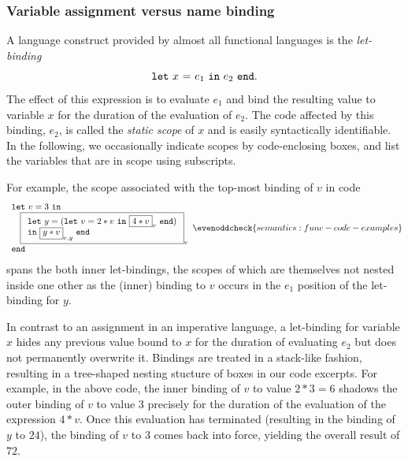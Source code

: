 \subsubsection{Variable assignment versus name binding}
A language construct provided by almost all functional languages is
the \emph{let-binding} $$\mathtt{let}\ {x}\ \mathtt{=}\ {e_1}\ \mathtt{in}\ {e_2}\ \mathtt{end}.$$ The effect of this
expression is to evaluate $e_1$ and bind the resulting value to
variable $x$ for the duration of the evaluation of $e_2$.  The code
affected by this binding, $e_2$, is called the \emph{static scope} of
$x$ and is easily syntactically identifiable.  In the following, we
occasionally indicate scopes by code-enclosing boxes, and list the
variables that are in scope using subscripts.

For example, the scope associated with the top-most binding of $v$ in
code
\begin{equation}
\label{FunctionalCodeExample1}
\begin{array}{l}
\mathtt{let}\ v = 3\ \mathtt{in}\\
\quad 
  \fbox{$
   \begin{array}[t]{l} 
    \mathtt{let}\ y = (\mathtt{let}\ v=2*v \ \mathtt{in}\ \fbox{$4*v$}_v\ \mathtt{end})\\
    \mathtt{in}\ \fbox{$y*v$}_{v,y}\ \mathtt{end}\\
\end{array}$}_v\\
\mathtt{end}
\end{array}
  \evenoddcheck{semantics:func-code-examples}
\end{equation}
spans the both inner let-bindings, the scopes of which are themselves
not nested inside one other as the (inner) binding to $v$ occurs in
the $e_1$ position of the let-binding for $y$.

In contrast to an assignment in an imperative language, a let-binding
for variable $x$ hides any previous value bound to $x$ for the
duration of evaluating $e_2$ but does not permanently overwrite
it. Bindings are treated in a stack-like fashion, resulting in a
tree-shaped nesting stucture of boxes in our code excerpts.
For example, in the above code, the inner binding of $v$ to value
$2*3=6$ shadows the outer binding of $v$ to value $3$ precisely for
the duration of the evaluation of the expression $4*v$. Once this
evaluation has terminated (resulting in the binding of $y$ to $24$),
the binding of $v$ to $3$ comes back into force, yielding the overall
result of $72$.

